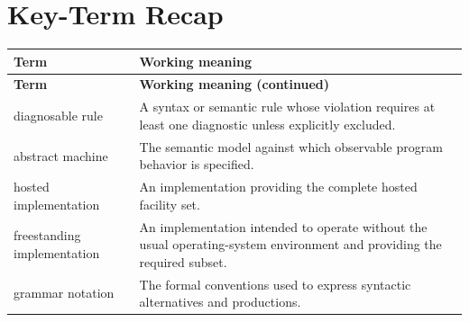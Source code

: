 \documentclass[11pt,letterpaper]{article}
\begin{document}
\section{Key-Term Recap}
\begin{longtable}{@{}>{\RaggedRight\arraybackslash}p{}>{\RaggedRight\arraybackslash}p{}@{}}\toprule\textbf{Term} & \textbf{Working meaning}\\\midrule\endfirsthead\toprule\textbf{Term} & \textbf{Working meaning (continued)}\\\midrule\endhead\bottomrule\endfoot
diagnosable rule & A syntax or semantic rule whose violation requires at least one diagnostic unless explicitly excluded.\\
abstract machine & The semantic model against which observable program behavior is specified.\\
hosted implementation & An implementation providing the complete hosted facility set.\\
freestanding implementation & An implementation intended to operate without the usual operating-system environment and providing the required subset.\\
grammar notation & The formal conventions used to express syntactic alternatives and productions.\\
\end{longtable}
\end{document}
